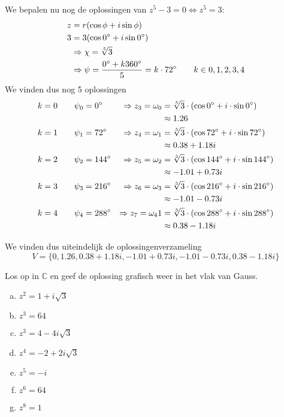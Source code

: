 \documentclass[12pt,twoside,a4]{article}
\begin{document}
We bepalen nu nog de oplossingen van $z^5 - 3 = 0 \Leftrightarrow z^5 = 3$:
\begin{align*}
  z &= r(\cos\phi + i\sin\phi)\\
  3 &= 3(\cos0^\circ + i\sin0^\circ)\\
    &\Rightarrow \chi = \sqrt[5]{3}\\
    &\Rightarrow \psi = \dfrac{ 0^\circ +  k360^\circ }{ 5 } = k\cdot72^\circ \qquad k\in{0, 1, 2, 3, 4}
\end{align*}
We vinden dus nog 5 oplossingen
\begin{align*}
  k=0 \qquad \psi_0 &= 0^\circ   &\Rightarrow z_3=\omega_0 &= \sqrt[5]{3} \cdot (\cos 0^\circ + i \cdot \sin 0^\circ)\\
            &             &           &\approx 1.26\\
  k=1 \qquad \psi_1 &= 72^\circ  &\Rightarrow z_4=\omega_1 &= \sqrt[5]{3} \cdot (\cos 72^\circ + i \cdot \sin 72^\circ)\\
            &             &           &\approx 0.38 + 1.18i\\
  k=2 \qquad \psi_2 &= 144^\circ &\Rightarrow z_5=\omega_2 &= \sqrt[5]{3} \cdot (\cos 144^\circ + i \cdot \sin 144^\circ)\\
            &             &           &\approx -1.01 + 0.73i\\
  k=3 \qquad \psi_3 &= 216^\circ &\Rightarrow z_6=\omega_3 &= \sqrt[5]{3} \cdot (\cos 216^\circ + i \cdot \sin 216^\circ)\\
            &             &           &\approx -1.01 - 0.73i\\
  k=4 \qquad \psi_4 &= 288^\circ &\Rightarrow z_7=\omega_41 &= \sqrt[5]{3} \cdot (\cos 288^\circ + i \cdot \sin 288^\circ)\\
            &             &           &\approx 0.38 - 1.18i\\
\end{align*}

We vinden dus uiteindelijk de oplossingenverzameling
\[V=\{0, 1.26, 0.38 + 1.18i, -1.01 + 0.73i, -1.01 - 0.73i, 0.38 - 1.18i\}\]



\begin{oefening}
Los op in $\mathbb{C}$ en geef de oplossing grafisch weer in het vlak van Gauss.
\begin{multicols}{2}
\begin{enumerate}[(a)]
  \itemsep.5em
  \item $\displaystyle z^2=1+i\sqrt{3}$
  \item $\displaystyle z^3=64$
  \item $\displaystyle z^3=4-4i\sqrt{3}$
  \item $\displaystyle z^4=-2+2i\sqrt{3}$
  \item $\displaystyle z^5=-i$
  \item $\displaystyle z^6=64$
  \item $\displaystyle z^8=1$
\end{enumerate}
\end{multicols}

\end{oefening}
\end{document}
